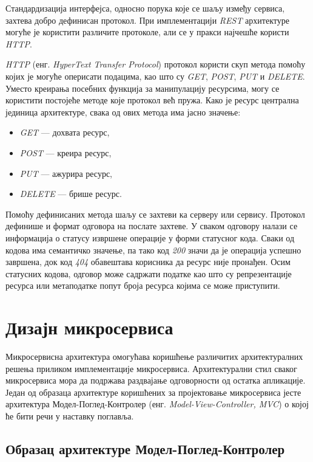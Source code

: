 \documentclass[12pt,oneside]{memoir}
\begin{document}
Стандардизација интерфејса, односно порука које се шаљу између сервиса, захтева добро дефинисан протокол. При имплементацији \textit{REST} архитектуре могуће је користити различите протоколе, али се у пракси најчешће користи \textit{HTTP}.

\textit{HTTP} (енг. \textit{HyperText Transfer Protocol}) протокол користи скуп метода помоћу којих је могуће оперисати подацима, као што су \textit{GET}, \textit{POST}, \textit{PUT} и \textit{DELETE}.  Уместо креирања посебних функција за манипулацију ресурсима, могу се користити постојеће методе које протокол већ пружа. Како је ресурс централна јединица архитектуре, свака од ових метода има јасно значење: 
\begin{itemize}
\item \textit{GET} --- дохвата ресурс,
\item \textit{POST} --- креира ресурс,
\item \textit{PUT} --- ажурира ресурс,
\item \textit{DELETE} --- брише ресурс.
\end{itemize}

Помоћу дефинисаних метода шаљу се захтеви ка серверу или сервису. Протокол дефинише и формат одговора на послате захтеве. У сваком одговору налази се информација о статусу извршене операције у форми статусног кода. Сваки од кодова има семантичко значење, па тако код \textit{200} значи да је операција успешно завршена, док код \textit{404} обавештава корисника да ресурс није пронађен. Осим статусних кодова, одговор може садржати податке као што су репрезентације ресурса или метаподатке попут броја ресурса којима се може приступити.

\newpage
\section{Дизајн микросервиса}

Микросервисна архитектура омогућава коришћење различитих архитектуралних решења приликом имплементације микросервиса. Архитектурални стил сваког микросервиса мора да подржава раздвајање одговорности од остатка апликације. Један од образаца архитектуре коришћених за пројектовање микросервиса јесте архитектура Модел-Поглед-Контролер (енг.\textit{ Model-View-Controller, MVC}) о којој ће бити речи у наставку поглавља.

\subsection{Образац архитектуре Модел-Поглед-Контролер}
\end{document}
